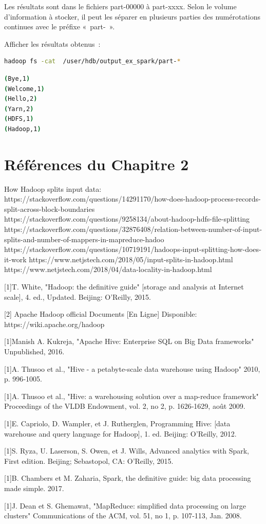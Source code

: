 \documentclass[12pt,english]{book}
\begin{document}
Les résultats sont dans le fichiers part-00000 à part-xxxx.
Selon le volume d’information à stocker, il peut les séparer en plusieurs parties des numérotations continues avec le préfixe « part- ».

Afficher les résultats obtenus :

\begin{lstlisting}[language=bash, frame=single, basicstyle=\footnotesize]
hadoop fs -cat  /user/hdb/output_ex_spark/part-*
\end{lstlisting}

\begin{lstlisting}[language=bash, frame=single, basicstyle=\footnotesize]
(Bye,1)
(Welcome,1)
(Hello,2)
(Yarn,2)
(HDFS,1)
(Hadoop,1)
\end{lstlisting}


\section{Références du Chapitre 2}

How Hadoop splits input data:
https://stackoverflow.com/questions/14291170/how-does-hadoop-process-records-split-across-block-boundaries
https://stackoverflow.com/questions/9258134/about-hadoop-hdfs-file-splitting
https://stackoverflow.com/questions/32876408/relation-between-number-of-input-splits-and-number-of-mappers-in-mapreduce-hadoo
https://stackoverflow.com/questions/10719191/hadoops-input-splitting-how-does-it-work
https://www.netjstech.com/2018/05/input-splits-in-hadoop.html
https://www.netjstech.com/2018/04/data-locality-in-hadoop.html		


[1]T. White, "Hadoop: the definitive guide" [storage and analysis at Internet scale], 4. ed., Updated. Beijing: O'Reilly, 2015.

[2] Apache Hadoop official Documents [En Ligne] Disponible: https://wiki.apache.org/hadoop

[1]Manish A. Kukreja, "Apache Hive: Enterprise SQL on Big Data frameworks" Unpublished, 2016.

[1]A. Thusoo et al., "Hive - a petabyte-scale data warehouse using Hadoop" 2010, p. 996‑1005.

[1]A. Thusoo et al., "Hive: a warehousing solution over a map-reduce framework" Proceedings of the VLDB Endowment, vol. 2, no 2, p. 1626‑1629, août 2009.

[1]E. Capriolo, D. Wampler, et J. Rutherglen, Programming Hive: [data warehouse and query language for Hadoop], 1. ed. Beijing: O'Reilly, 2012.

[1]S. Ryza, U. Laserson, S. Owen, et J. Wills, Advanced analytics with Spark, First edition. Beijing; Sebastopol, CA: O'Reilly, 2015.

[1]B. Chambers et M. Zaharia, Spark,  the definitive guide: big data processing made simple. 2017.

[1]J. Dean et S. Ghemawat, "MapReduce: simplified data processing on large clusters" Communications of the ACM, vol. 51, no 1, p. 107‑113, Jan. 2008.
\end{document}
